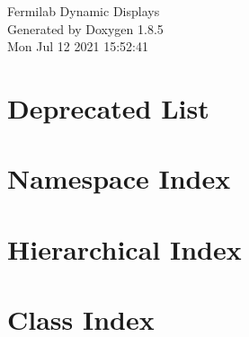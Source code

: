 \documentclass[twoside]{book}
\newcommand{\clearemptydoublepage}{%
  \newpage{\pagestyle{empty}\cleardoublepage}%
}
\begin{document}
\hypersetup{pageanchor=false}
\begin{titlepage}
\vspace*{7cm}
\begin{center}%
{\Large Fermilab Dynamic Displays }\\
\vspace*{1cm}
{\large Generated by Doxygen 1.8.5}\\
\vspace*{0.5cm}
{\small Mon Jul 12 2021 15:52:41}\\
\end{center}
\end{titlepage}
\clearemptydoublepage
\tableofcontents
\clearemptydoublepage
{}
\hypersetup{pageanchor=true}

\chapter{Deprecated List}
\label{deprecated}
\hypertarget{deprecated}{}

\chapter{Namespace Index}

\chapter{Hierarchical Index}

\chapter{Class Index}

\end{document}
